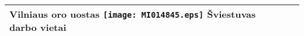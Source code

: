 \documentclass[a4paper,12pt]{article}
\begin{document}
\begin{supertabular}{|p{4.2cm}|p{4.2cm}|p{4.2cm}|p{4.2cm}|}
Vilniaus oro uostas \newline \texttt{[image: MI014845.eps]} \newline Šviestuvas darbo vietai \newline \footnotesize {} &  &  & \\\hline

\end{supertabular}
\end{document}
